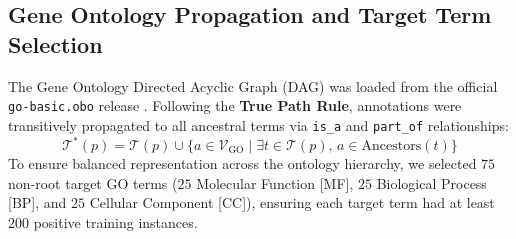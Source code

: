 \documentclass[journal]{IEEEtran}
\begin{document}
\subsection{Gene Ontology Propagation and Target Term Selection}
The Gene Ontology Directed Acyclic Graph (DAG) was loaded from the official \texttt{go-basic.obo} release \cite{go2021resource}. Following the \textbf{True Path Rule}, annotations were transitively propagated to all ancestral terms via \texttt{is\_a} and \texttt{part\_of} relationships:
\begin{equation}
\mathcal{T}^*(p) = \mathcal{T}(p) \cup \{ a \in \mathcal{V}_{\text{GO}} \mid \exists t \in \mathcal{T}(p), \, a \in \text{Ancestors}(t) \}
\end{equation}
To ensure balanced representation across the ontology hierarchy, we selected $75$ non-root target GO terms ($25$ Molecular Function [MF], $25$ Biological Process [BP], and $25$ Cellular Component [CC]), ensuring each target term had at least $200$ positive training instances.
\end{document}
